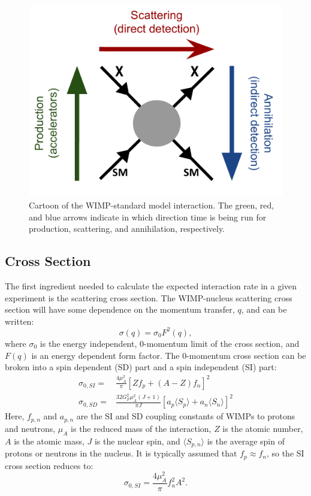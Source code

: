 \begin{figure}[h!]
\centering
\includegraphics[width=150mm]{Figures/WIMP_interaction.pdf}
\caption{Cartoon of the WIMP-standard model interaction. The green, red, and blue arrows indicate in which direction time is being run for production, scattering, and annihilation, respectively.}
\label{fig:WIMP_SM} 
\end{figure}

\subsection{Cross Section}\label{sec:wimpcrosssection}
The first ingredient needed to calculate the expected interaction rate in a given experiment is the scattering cross section. The WIMP-nucleus scattering cross section will have some dependence on the momentum transfer, $q$, and can be written\cite{dmintro}:
\begin{equation}\label{eq:cross_sec1}
\sigma(q)=\sigma_0F^2(q),
\end{equation}
where $\sigma_0$ is the energy independent, 0-momentum limit of the cross section, and $F(q)$ is an energy dependent form factor. The 0-momentum cross section can be broken into a spin dependent (SD) part and a spin independent (SI) part\cite{wimp_nucleon,dmintro}:
\begin{equation}\label{eq:sisd_cs}
\begin{split}
\sigma_{0,SI}=& \frac{4\mu_A^2}{\pi}[Zf_p+(A-Z)f_n]^2 \\
\sigma_{0,SD}=& \frac{32G_F^2\mu_A^2(J+1)}{\pi J}[a_p\langle S_p \rangle + a_n\langle S_n \rangle ]^2
\end{split}
\end{equation} 
Here, $f_{p,n}$ and $a_{p,n}$ are the SI and SD coupling constants of WIMPs to protons and neutrons, $\mu_A$ is the reduced mass of the interaction, $Z$ is the atomic number, $A$ is the atomic mass, $J$ is the nuclear spin, and $\langle S_{p,n} \rangle$ is the average spin of protons or neutrons in the nucleus. It is typically assumed that $f_p \approx f_n$, so the SI cross section reduces to:
\begin{equation}\label{eq:sics}
\sigma_{0,SI}= \frac{4\mu_A^2}{\pi}f_n^2A^2. 
\end{equation} 

